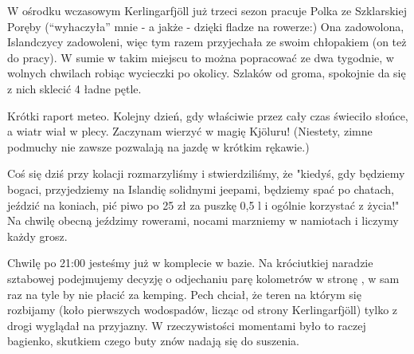 W ośrodku wczasowym Kerlingarfjöll już trzeci sezon pracuje Polka ze Szklarskiej Poręby (“wyhaczyła” mnie - a jakże - dzięki fladze na rowerze:) Ona zadowolona, Islandczycy zadowoleni, więc tym razem przyjechała ze swoim chłopakiem (on też do pracy). W sumie w takim miejscu to można popracować ze dwa tygodnie, w wolnych chwilach robiąc wycieczki po okolicy. Szlaków od groma, spokojnie da się z nich sklecić 4 ładne pętle.


Krótki raport meteo. Kolejny dzień, gdy właściwie przez cały czas świeciło słońce, a wiatr wiał w plecy. Zaczynam wierzyć w magię Kjöluru! (Niestety, zimne podmuchy nie zawsze pozwalają na jazdę w krótkim rękawie.)

Coś się dziś przy kolacji rozmarzyliśmy i stwierdziliśmy, że "kiedyś, gdy będziemy bogaci, przyjedziemy na Islandię solidnymi jeepami, będziemy spać po chatach, jeździć na koniach, pić piwo po 25 zł za puszkę 0,5 l i ogólnie korzystać z życia!" Na chwilę obecną jeździmy rowerami, nocami marzniemy w namiotach i liczymy każdy grosz.

Chwilę po 21:00 jesteśmy już w komplecie w bazie. Na króciutkiej naradzie sztabowej podejmujemy decyzję o odjechaniu parę kolometrów w stronę , w sam raz na tyle by nie płacić za kemping. Pech chciał, że teren na którym się rozbijamy (koło pierwszych wodospadów, licząc od strony Kerlingarfjöll) tylko z drogi wyglądał na przyjazny. W rzeczywistości momentami było to raczej bagienko, skutkiem czego buty znów nadają się do suszenia.

